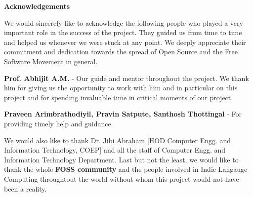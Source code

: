 \fontsize{12pt}{5}		
\linespread{5.0}		%
\selectfont	

\begin{center}
\textbf{{Acknowledgements}}
\end{center}

We would sincerely like to acknowledge the following people who played a very important role in the success of the project. They guided us from time to time and helped us whenever we were stuck at any point. We deeply appreciate their commitment and dedication towards the spread of Open Source and the Free Software Movement in general.

\textbf{Prof. Abhijit A.M.} - Our guide and mentor throughout the project. We thank him for giving us the opportunity to work with him and in particular on this project and for spending invaluable time in critical moments of our project.

\textbf{Praveen Arimbrathodiyil, Pravin Satpute, Santhosh Thottingal} - For providing timely help and guidance.

We would also like to thank Dr. Jibi Abraham [HOD Computer Engg. and Information Technology, COEP] and all the staff of Computer Engg. and Information Technology Department. Last but not the least, we would like to thank the whole \textbf{FOSS community} and the people involved in Indic Langauge Computing throughtout the world without whom this project would not have been a reality.
